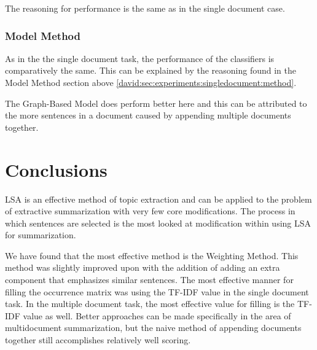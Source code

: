 \documentclass[../writeup.tex]{subfiles}
\begin{document}
The reasoning for performance is the same as in the single document case.


\subsubsection{Model Method}\label{david:sec:experiments:multidocument:method}

As in the the single document task, the performance of the classifiers is comparatively the same. This can be explained by the reasoning found in the Model Method section above \ref{david:sec:experiments:singledocument:method}.

The Graph-Based Model does perform better here and this can be attributed to the more sentences in a document caused by appending multiple documents together.

\section{Conclusions}\label{david:sec:conclusion}

LSA is an effective method of topic extraction and can be applied to the problem of extractive summarization with very few core modifications. The process in which sentences are selected is the most looked at modification within using LSA for summarization.

We have found that the most effective method is the Weighting Method. This method was slightly improved upon with the addition of adding an extra component that emphasizes similar sentences. The most effective manner for filling the occurrence matrix was using the TF-IDF value in the single document task. In the multiple document task, the most effective value for filling is the TF-IDF value as well. Better approaches can be made specifically in the area of multidocument summarization, but the naive method of appending documents together still accomplishes relatively well scoring.
\end{document}
